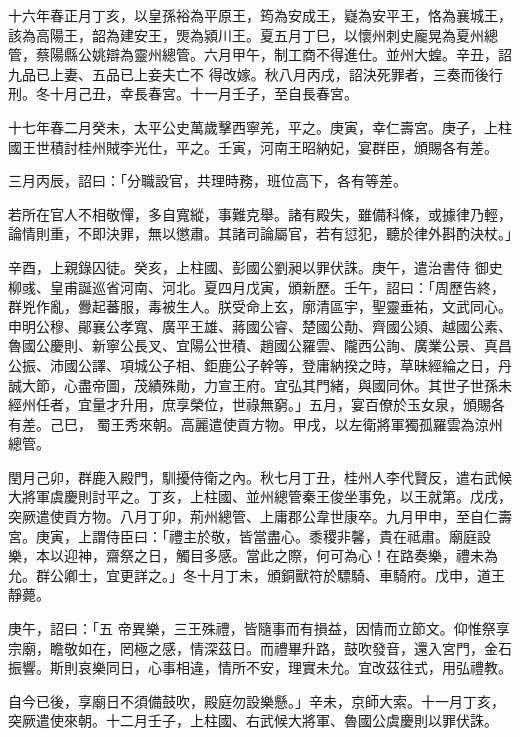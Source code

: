 \begin{pinyinscope}
 十六年春正月丁亥，以皇孫裕為平原王，筠為安成王，嶷為安平王，恪為襄城王，該為高陽王，韶為建安王，煚為潁川王。夏五月丁巳，以懷州刺史龐晃為夏州總管，蔡陽縣公姚辯為靈州總管。六月甲午，制工商不得進仕。並州大蝗。辛丑，詔九品已上妻、五品已上妾夫亡不
 得改嫁。秋八月丙戌，詔決死罪者，三奏而後行刑。冬十月己丑，幸長春宮。十一月壬子，至自長春宮。



 十七年春二月癸未，太平公史萬歲擊西寧羌，平之。庚寅，幸仁壽宮。庚子，上柱國王世積討桂州賊李光仕，平之。壬寅，河南王昭納妃，宴群臣，頒賜各有差。



 三月丙辰，詔曰：「分職設官，共理時務，班位高下，各有等差。



 若所在官人不相敬憚，多自寬縱，事難克舉。諸有殿失，雖備科條，或據律乃輕，論情則重，不即決罪，無以懲肅。其諸司論屬官，若有愆犯，聽於律外斟酌決杖。」



 辛酉，上親錄囚徒。癸亥，上柱國、彭國公劉昶以罪伏誅。庚午，遣治書侍
 御史柳彧、皇甫誕巡省河南、河北。夏四月戊寅，頒新歷。壬午，詔曰：「周歷告終，群兇作亂，釁起蕃服，毒被生人。朕受命上玄，廓清區宇，聖靈垂祐，文武同心。申明公穆、鄖襄公孝寬、廣平王雄、蔣國公睿、楚國公勣、齊國公熲、越國公素、魯國公慶則、新寧公長叉、宜陽公世積、趙國公羅雲、隴西公詢、廣業公景、真昌公振、沛國公譯、項城公子相、鉅鹿公子幹等，登庸納揆之時，草昧經綸之日，丹誠大節，心盡帝圖，茂績殊勛，力宣王府。宜弘其門緒，與國同休。其世子世孫未經州任者，宜量才升用，庶享榮位，世祿無窮。」五月，宴百僚於玉女泉，頒賜各有差。己巳，
 蜀王秀來朝。高麗遣使貢方物。甲戌，以左衛將軍獨孤羅雲為涼州總管。



 閏月己卯，群鹿入殿門，馴擾侍衛之內。秋七月丁丑，桂州人李代賢反，遣右武候大將軍虞慶則討平之。丁亥，上柱國、並州總管秦王俊坐事免，以王就第。戊戌，突厥遣使貢方物。八月丁卯，荊州總管、上庸郡公韋世康卒。九月甲申，至自仁壽宮。庚寅，上謂侍臣曰：「禮主於敬，皆當盡心。黍稷非馨，貴在祗肅。廟庭設樂，本以迎神，齋祭之日，觸目多感。當此之際，何可為心！在路奏樂，禮未為允。群公卿士，宜更詳之。」冬十月丁未，頒銅獸符於驃騎、車騎府。戊申，道王靜薨。



 庚午，詔曰：「五
 帝異樂，三王殊禮，皆隨事而有損益，因情而立節文。仰惟祭享宗廟，瞻敬如在，罔極之感，情深茲日。而禮畢升路，鼓吹發音，還入宮門，金石振響。斯則哀樂同日，心事相違，情所不安，理實未允。宜改茲往式，用弘禮教。



 自今已後，享廟日不須備鼓吹，殿庭勿設樂懸。」辛未，京師大索。十一月丁亥，突厥遣使來朝。十二月壬子，上柱國、右武候大將軍、魯國公虞慶則以罪伏誅。




\end{pinyinscope}
